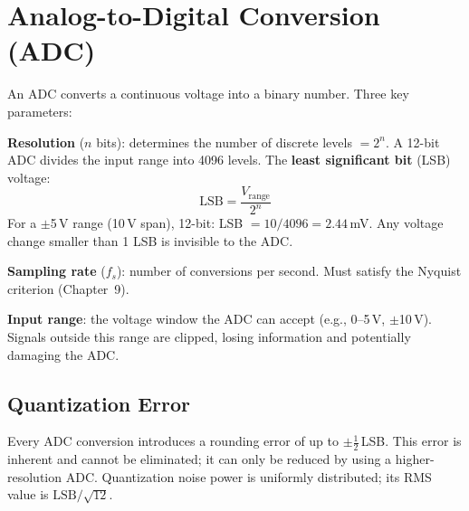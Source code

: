 \documentclass[11pt,letterpaper,twoside,openany]{book}
\begin{document}
\section{Analog-to-Digital Conversion (ADC)}
An ADC converts a continuous voltage into a binary number. Three key parameters:

\textbf{Resolution} ($n$ bits): determines the number of discrete levels $= 2^n$. A 12-bit ADC divides the input range into 4096 levels. The \textbf{least significant bit} (LSB) voltage:
\begin{equation}
\text{LSB} = \frac{V_{\text{range}}}{2^n}
\end{equation}
For a $\pm$5\,V range (10\,V span), 12-bit: LSB $= 10/4096 = 2.44$\,mV. Any voltage change smaller than 1 LSB is invisible to the ADC.

\textbf{Sampling rate} ($f_s$): number of conversions per second. Must satisfy the Nyquist criterion (Chapter~9).

\textbf{Input range}: the voltage window the ADC can accept (e.g., 0--5\,V, $\pm$10\,V). Signals outside this range are clipped, losing information and potentially damaging the ADC.

\subsection{Quantization Error}
Every ADC conversion introduces a rounding error of up to $\pm \frac{1}{2}$\,LSB. This error is inherent and cannot be eliminated; it can only be reduced by using a higher-resolution ADC. Quantization noise power is uniformly distributed; its RMS value is $\text{LSB}/\sqrt{12}$.
\end{document}
